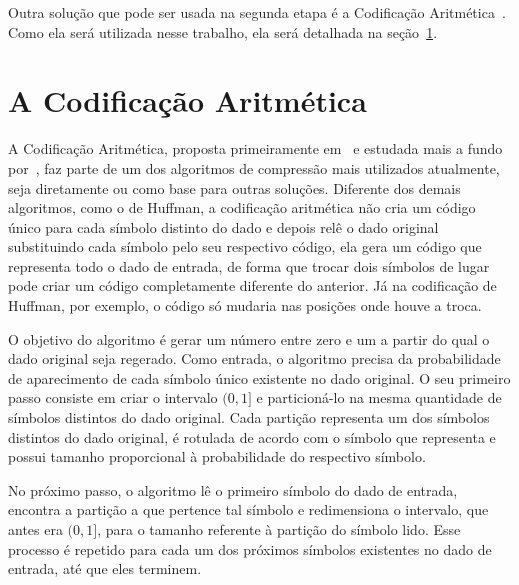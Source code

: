 
Outra solução que pode ser usada na segunda etapa é a Codificação
Aritmética~\citep{Book:ArithmeticCoding}.
Como ela será utilizada nesse trabalho, ela será detalhada na
seção~\ref{Subsec:CodificacaoAritmetica}.

\section{A Codificação Aritmética}
\label{Subsec:CodificacaoAritmetica}

A Codificação Aritmética, proposta primeiramente
em~\citep{Book:ArithmeticCoding} e estudada mais a fundo
por~\citep{Artigo:ArithmeticCoding}, faz parte de um dos algoritmos de
compressão mais utilizados atualmente, seja diretamente ou como base para
outras soluções. Diferente dos demais algoritmos, como o de Huffman,
a codificação aritmética não cria um código único para cada símbolo distinto do
dado e depois relê o dado original substituindo cada símbolo pelo seu respectivo
código, ela gera um código que representa todo o dado de
entrada, de forma que trocar dois símbolos de lugar pode criar um código
completamente diferente do anterior. Já na codificação de Huffman, por exemplo,
o código só mudaria nas posições onde houve a troca.

O objetivo do algoritmo é gerar um número entre zero e um a partir do qual o
dado original seja regerado. Como entrada, o algoritmo precisa da probabilidade
de aparecimento de cada símbolo único existente no dado original. O seu
primeiro passo consiste em criar o intervalo $(0, 1]$ e particioná-lo na mesma
quantidade de símbolos distintos do dado original. Cada partição representa um
dos símbolos distintos do dado original, é rotulada de acordo com o símbolo que
representa e possui tamanho proporcional à probabilidade do respectivo símbolo.

No próximo passo, o algoritmo lê o primeiro
símbolo do dado de entrada, encontra a partição a que pertence tal
símbolo e redimensiona o intervalo, que antes era $(0, 1]$, para o tamanho
referente à partição do símbolo lido. Esse processo é repetido para cada
um dos próximos símbolos existentes no dado de entrada, até que eles terminem.

